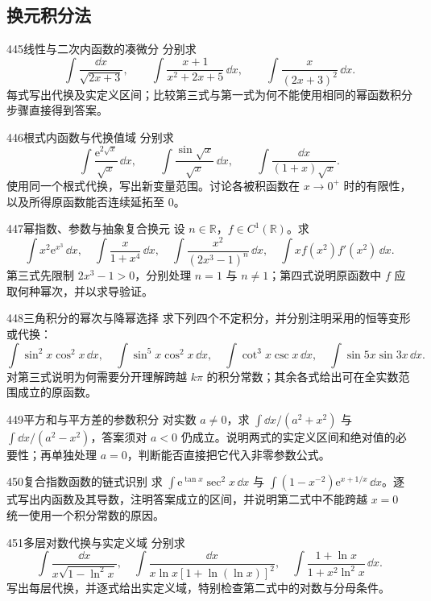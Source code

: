 \subsection{换元积分法}
\begin{exercise}{445}{线性与二次内函数的凑微分}
分别求
\[\int\frac{\dd x}{\sqrt{2x+3}},\qquad \int\frac{x+1}{x^2+2x+5}\,\dd x,\qquad \int\frac{x}{(2x+3)^2}\,\dd x.\]
每式写出代换及实定义区间；比较第三式与第一式为何不能使用相同的幂函数积分步骤直接得到答案。
\end{exercise}
\begin{exercise}{446}{根式内函数与代换值域}
分别求
\[\int\frac{\mathrm e^{2\sqrt x}}{\sqrt x}\,\dd x,\qquad \int\frac{\sin\sqrt x}{\sqrt x}\,\dd x,\qquad \int\frac{\dd x}{(1+x)\sqrt x}.\]
使用同一个根式代换，写出新变量范围。讨论各被积函数在 $x\to0^+$ 时的有限性，以及所得原函数能否连续延拓至 $0$。
\end{exercise}
\begin{exercise}{447}{幂指数、参数与抽象复合换元}
设 $n\in\mathbb R$，$f\in C^1(\mathbb R)$。求
\[\int x^2\mathrm e^{x^3}\,\dd x,\quad \int\frac{x}{1+x^4}\,\dd x,\quad \int\frac{x^2}{(2x^3-1)^n}\,\dd x,\quad \int xf(x^2)f'(x^2)\,\dd x.\]
第三式先限制 $2x^3-1>0$，分别处理 $n=1$ 与 $n\ne1$；第四式说明原函数中 $f$ 应取何种幂次，并以求导验证。
\end{exercise}
\begin{exercise}{448}{三角积分的幂次与降幂选择}
求下列四个不定积分，并分别注明采用的恒等变形或代换：
\[\int\sin^2x\cos^2x\,\dd x,\quad \int\sin^5x\cos^2x\,\dd x,\quad \int\cot^3x\csc x\,\dd x,\quad \int\sin5x\sin3x\,\dd x.\]
对第三式说明为何需要分开理解跨越 $k\pi$ 的积分常数；其余各式给出可在全实数范围成立的原函数。
\end{exercise}
\begin{exercise}{449}{平方和与平方差的参数积分}
对实数 $a\ne0$，求 $\int\dd x/(a^2+x^2)$ 与 $\int\dd x/(a^2-x^2)$，答案须对 $a<0$ 仍成立。说明两式的实定义区间和绝对值的必要性；再单独处理 $a=0$，判断能否直接把它代入非零参数公式。
\end{exercise}
\begin{exercise}{450}{复合指数函数的链式识别}
求 $\int\mathrm e^{\tan x}\sec^2x\,\dd x$ 与 $\int(1-x^{-2})\mathrm e^{x+1/x}\,\dd x$。逐式写出内函数及其导数，注明答案成立的区间，并说明第二式中不能跨越 $x=0$ 统一使用一个积分常数的原因。
\end{exercise}
\begin{exercise}{451}{多层对数代换与实定义域}
分别求
\[\int\frac{\dd x}{x\sqrt{1-\ln^2x}},\quad \int\frac{\dd x}{x\ln x[1+\ln(\ln x)]^2},\quad \int\frac{1+\ln x}{1+x^2\ln^2x}\,\dd x.\]
写出每层代换，并逐式给出实定义域，特别检查第二式中的对数与分母条件。
\end{exercise}
